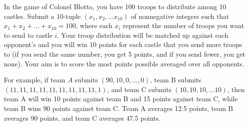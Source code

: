 In the game of Colonel Blotto, you have 100 troops to distribute among 10 castles. Submit a 10-tuple $(x_1, x_2, \dots x_{10})$ of nonnegative integers such that $x_1 + x_2 + \dots + x_{10} = 100$, where each $x_i$ represent the number of troops you want to send to castle $i$. Your troop distribution will be matched up against each opponent's and you will win 10 points for each castle that you send more troops to (if you send the same number, you get 5 points, and if you send fewer, you get none). Your aim is to score the most points possible averaged over all opponents.

For example, if team $A$ submits $(90,10,0,\dots,0)$, team B submits $(11,11,11,11,11,11,11,11,11,1)$, and team C submits $(10,10,10,\dots 10)$, then team A will win 10 points against team B and 15 points against team C, while team B wins 90 points against team C. Team A averages 12.5 points, team B averages 90 points, and team C averages 47.5 points.